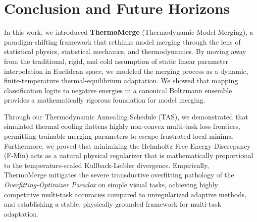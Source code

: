 \section{Conclusion and Future Horizons}
\label{sec:conclusion}

In this work, we introduced \textbf{ThermoMerge} (Thermodynamic Model Merging), a paradigm-shifting framework that rethinks model merging through the lens of statistical physics, statistical mechanics, and thermodynamics. By moving away from the traditional, rigid, and cold assumption of static linear parameter interpolation in Euclidean space, we modeled the merging process as a dynamic, finite-temperature thermal-equilibrium adaptation. We showed that mapping classification logits to negative energies in a canonical Boltzmann ensemble provides a mathematically rigorous foundation for model merging.

Through our Thermodynamic Annealing Schedule (TAS), we demonstrated that simulated thermal cooling flattens highly non-convex multi-task loss frontiers, permitting trainable merging parameters to escape frustrated local minima. Furthermore, we proved that minimizing the Helmholtz Free Energy Discrepancy (F-Min) acts as a natural physical regularizer that is mathematically proportional to the temperature-scaled Kullback-Leibler divergence. Empirically, ThermoMerge mitigates the severe transductive overfitting pathology of the \emph{Overfitting-Optimizer Paradox} on simple visual tasks, achieving highly competitive multi-task accuracies compared to unregularized adaptive methods, and establishing a stable, physically grounded framework for multi-task adaptation.

